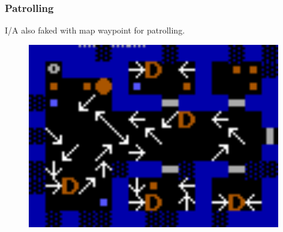 \subsubsection{Patrolling}
I/A also faked with map waypoint for patrolling.\\
\par
\par
\begin{figure}[H]
 \centering
 \includegraphics[width=0.98\textwidth]{imgs/drawings/path.png}
\end{figure}
\par








